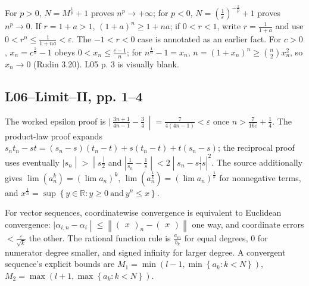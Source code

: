 For \(p > 0\), \(N = M^{\frac{1}{p}} + 1\) proves \(n^{p}\rightarrow + \infty\); for \(p < 0\), \(N = \left( \frac{1}{\varepsilon} \right)^{- \frac{1}{p}} + 1\) proves \(n^{p}\rightarrow 0\). If \(r = 1 + a > 1\), \(\left( {1 + a} \right)^{n} \geq 1 + na\); if \(0 < r < 1\), write \(r = \frac{1}{1 + a}\) and use \(0 < r^{n} \leq \frac{1}{1 + na} < \varepsilon\). The \(- 1 < r < 0\) case is annotated as an earlier fact. For \(c > 0\), \(x_{n} = c^{\frac{1}{n}} - 1\) obeys \(0 < x_{n} \leq \frac{c - 1}{n}\); for \(n^{\frac{1}{n}} - 1 = x_{n}\), \(n = \left( {1 + x_{n}} \right)^{n} \geq \binom{n}{2}x_{n}^{2}\), so \(x_{n}\rightarrow 0\) (Rudin 3.20). L05 p. 3 is visually blank.

\subsection{L06--Limit--II, pp. 1--4}

The worked epsilon proof is \(\left. |\ \frac{3n + 1}{4n - 1} - \frac{3}{4}\  \middle| = \frac{7}{4\left( {4n - 1} \right)} < \varepsilon \right.\) once \(n > \frac{7}{16\varepsilon} + \frac{1}{4}\). The product-law proof expands \(s_{n}t_{n} - st = \left( {s_{n} - s} \right)\left( {t_{n} - t} \right) + s\left( {t_{n} - t} \right) + t\left( {s_{n} - s} \right)\); the reciprocal proof uses eventually \(\left. |s_{n} \middle| > \middle| s\frac{|}{2} \right.\) and \(\left. |\frac{1}{s_{n}} - \frac{1}{s} \middle| < 2 \middle| s_{n} - s\frac{|}{|}s|^{2} \right.\). The source additionally gives \(\lim\left( a_{n}^{k} \right) = \left( {\lim a_{n}} \right)^{k}\), \(\lim\left( a_{n}^{\frac{1}{k}} \right) = \left( {\lim a_{n}} \right)^{\frac{1}{k}}\) for nonnegative terms, and \(x^{\frac{1}{n}} = \sup\left\{ {y \in \mathbb{R}:y \geq 0\ \text{and}\ y^{n} \leq x} \right\}\).

For vector sequences, coordinatewise convergence is equivalent to Euclidean convergence: \(\left. |\alpha_{i,n} - \alpha_{i} \middle| \leq \left\| {\begin{pmatrix}
x
\end{pmatrix}_{n} - \begin{pmatrix}
x
\end{pmatrix}} \right\| \right.\) one way, and coordinate errors \(< \frac{\varepsilon}{\sqrt{k}}\) the other. The rational function rule is \(\frac{a_{m}}{b_{k}}\) for equal degrees, \(0\) for numerator degree smaller, and signed infinity for larger degree. A convergent sequence's explicit bounds are \(M_{1} = \min\left( {l - 1,\min\left\{ {a_{k}:k < N} \right\}} \right)\), \(M_{2} = \max\left( {l + 1,\max\left\{ {a_{k}:k < N} \right\}} \right)\).

